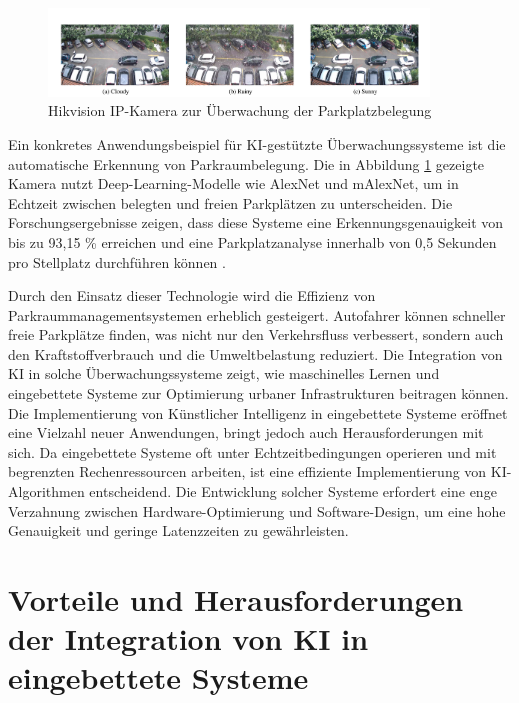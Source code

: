 \begin{figure}[h]
	\centering
	\includegraphics[width=0.9\textwidth]{img/hikvision_parking.png}
	\caption{Hikvision IP-Kamera zur Überwachung der Parkplatzbelegung \cite{Farley.2021}}
	\label{fig:hikvision}
\end{figure}  
Ein konkretes Anwendungsbeispiel für KI-gestützte Überwachungssysteme ist die automatische Erkennung von Parkraumbelegung. Die in Abbildung \ref{fig:hikvision} gezeigte Kamera nutzt Deep-Learning-Modelle wie AlexNet und mAlexNet, um in Echtzeit zwischen belegten und freien Parkplätzen zu unterscheiden. Die Forschungsergebnisse zeigen, dass diese Systeme eine Erkennungsgenauigkeit von bis zu 93,15 \% erreichen und eine Parkplatzanalyse innerhalb von 0,5 Sekunden pro Stellplatz durchführen können \cite{Farley.2021}.  

Durch den Einsatz dieser Technologie wird die Effizienz von Parkraummanagementsystemen erheblich gesteigert. Autofahrer können schneller freie Parkplätze finden, was nicht nur den Verkehrsfluss verbessert, sondern auch den Kraftstoffverbrauch und die Umweltbelastung reduziert. Die Integration von KI in solche Überwachungssysteme zeigt, wie maschinelles Lernen und eingebettete Systeme zur Optimierung urbaner Infrastrukturen beitragen können.\\  

Die Implementierung von Künstlicher Intelligenz in eingebettete Systeme eröffnet eine Vielzahl neuer Anwendungen, bringt jedoch auch Herausforderungen mit sich. Da eingebettete Systeme oft unter Echtzeitbedingungen operieren und mit begrenzten Rechenressourcen arbeiten, ist eine effiziente Implementierung von KI-Algorithmen entscheidend. Die Entwicklung solcher Systeme erfordert eine enge Verzahnung zwischen Hardware-Optimierung und Software-Design, um eine hohe Genauigkeit und geringe Latenzzeiten zu gewährleisten.  

\section{Vorteile und Herausforderungen der Integration von KI in eingebettete Systeme}

